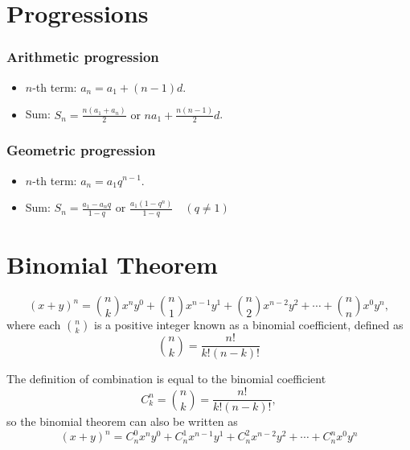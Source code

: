 \chapter{Progressions}
\subsection{Arithmetic progression}
\begin{itemize}
\item $n$-th term: $a_n=a_1+(n-1)d$.
\item Sum: $S_n=\frac{n(a_1+a_n)}2\text{ or }na_1+\frac{n(n-1)}2d$.
\end{itemize}
\subsection{Geometric progression}
\begin{itemize}
\item $n$-th term: $a_n=a_1q^{n-1}$.
\item Sum: $S_n=\frac{a_1-a_nq}{1-q}\text{ or }\frac{a_1(1-q^n)}{1-q}\quad(q\neq 1)$
\end{itemize}
\chapter{Binomial Theorem}
\[
(x+y)^n=\binom{n}{k}x^ny^0+\binom{n}{1}x^{n-1}y^1+\binom{n}{2}x^{n-2}y^2+\cdots+\binom{n}{n}x^0y^n,
\]
where each $\binom{n}{k}$ is a positive integer known as a binomial coefficient, defined as
\[
\binom{n}{k}=\frac{n!}{k!(n-k)!}
\]
\begin{note}
The definition of combination is equal to the binomial coefficient
\[
C_k^n=\binom{n}{k}=\frac{n!}{k!(n-k)!},
\]
so the binomial theorem can also be written as
\[
(x+y)^n=C_n^0x^ny^0+C_n^1x^{n-1}y^1+C_n^2x^{n-2}y^2+\cdots+C_n^nx^0y^n
\]
\end{note}
